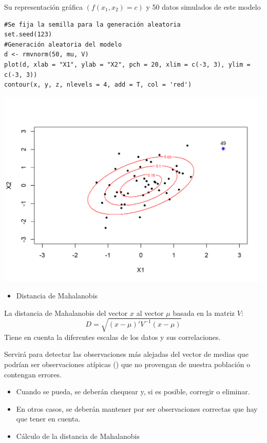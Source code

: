 Su representación gráfica $\left(f(x_1,x_2)=c\right)$ y 50 datos simulados de este modelo

\begin{lstlisting}
#Se fija la semilla para la generación aleatoria
set.seed(123)
#Generación aleatoria del modelo
d <- rmvnorm(50, mu, V)
plot(d, xlab = "X1", ylab = "X2", pch = 20, xlim = c(-3, 3), ylim = c(-3, 3))
contour(x, y, z, nlevels = 4, add = T, col = 'red')
\end{lstlisting}

\begin{center}
\includegraphics{"Temas/Imágenes/Tema 1/000014.png"}
\end{center}

\begin{itemize}[label=\color{red}\textbullet, leftmargin=*]
	\item \color{lightblue}Distancia de Mahalanobis
\end{itemize}

La distancia de Mahalanobis del vector $x$ al vector $\mu$ basada en la matriz $V$: \[ D=\sqrt{(x-\mu)'V^{-1}(x-\mu)} \]
Tiene en cuenta la diferentes escalas de los datos y sus correlaciones.

Servirá para detectar las observaciones más alejadas del vector de medias que podrían ser observaciones atípicas () que no provengan de nuestra población o contengan errores.
\begin{itemize}[label=$\to$]
\item Cuando se pueda, se deberán chequear y, si es posible, corregir o eliminar.
\item En otros casos, se deberán mantener por ser observaciones correctas que hay que tener en cuenta.
\end{itemize}
\begin{itemize}[label=\color{red}\textbullet, leftmargin=*]
	\item \color{lightblue}Cálculo de la distancia de Mahalanobis
\end{itemize}


